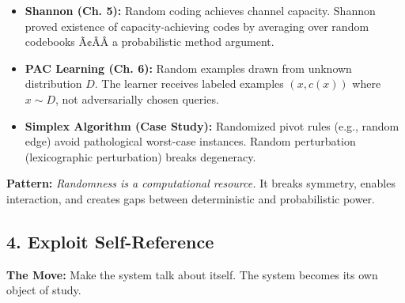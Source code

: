 \begin{itemize}
\item \textbf{Shannon (Ch. 5):} Random coding achieves channel capacity. Shannon proved existence of capacity-achieving codes by averaging over random codebooks Ã¢ÂÂ a probabilistic method argument.

\item \textbf{PAC Learning (Ch. 6):} Random examples drawn from unknown distribution $D$. The learner receives labeled examples $(x, c(x))$ where $x \sim D$, not adversarially chosen queries.

\item \textbf{Simplex Algorithm (Case Study):} Randomized pivot rules (e.g., random edge) avoid pathological worst-case instances. Random perturbation (lexicographic perturbation) breaks degeneracy.
\end{itemize}

\begin{mentalLeap}\textbf{Pattern:} \emph{Randomness is a computational resource.} It breaks symmetry, enables interaction, and creates gaps between deterministic and probabilistic power.\end{mentalLeap}
\subsection{4. Exploit Self-Reference}
\label{sec:anatomy:selfref}

\textbf{The Move:} Make the system talk about itself. The system becomes its own object of study.

